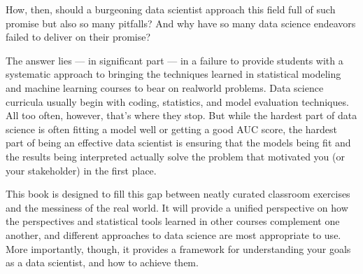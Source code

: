 \documentclass[letterpaper,10pt,english]{jupyterBook}
\begin{document}
\sphinxAtStartPar
How, then, should a burgeoning data scientist approach this field full of such promise but also so many pitfalls? And why have so many data science endeavors failed to deliver on their promise?

\sphinxAtStartPar
The answer lies — in significant part — in a failure to provide students with a systematic approach to bringing the techniques learned in statistical modeling and machine learning courses to bear on real\sphinxhyphen{}world problems. Data science curricula usually begin with coding, statistics, and model evaluation techniques. All too often, however, that’s where they stop. But while the hardest part of data science  is often fitting a model well or getting a good AUC score, the hardest part of being an effective  data scientist is ensuring that the models being fit and the results being interpreted actually solve the problem that motivated you (or your stakeholder) in the first place.

\sphinxAtStartPar
This book is designed to fill this gap between neatly curated classroom exercises and the messiness of the real world.  It will provide a unified perspective on how the perspectives and statistical tools learned in other courses complement one another, and  different approaches to data science are most appropriate to use. More importantly, though, it provides a framework for understanding your goals as a data scientist, and how to achieve them.
\end{document}
